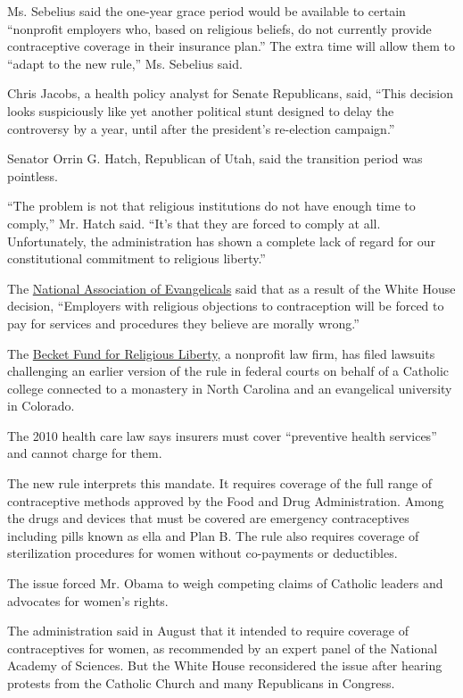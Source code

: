 Ms. Sebelius said the one-year grace period would be available to
certain ``nonprofit employers who, based on religious beliefs, do not
currently provide contraceptive coverage in their insurance plan.'' The
extra time will allow them to ``adapt to the new rule,'' Ms. Sebelius
said.

Chris Jacobs, a health policy analyst for Senate Republicans, said,
``This decision looks suspiciously like yet another political stunt
designed to delay the controversy by a year, until after the president's
re-election campaign.''

Senator Orrin G. Hatch, Republican of Utah, said the transition period
was pointless.

``The problem is not that religious institutions do not have enough time
to comply,'' Mr. Hatch said. ``It's that they are forced to comply at
all. Unfortunately, the administration has shown a complete lack of
regard for our constitutional commitment to religious liberty.''

The
\href{http://www.nae.net/news/715-press-release-evangelicals-disappointed-with-white-house-decision-on-conscience-protection}{National
Association of Evangelicals} said that as a result of the White House
decision, ``Employers with religious objections to contraception will be
forced to pay for services and procedures they believe are morally
wrong.''

The
\href{http://www.becketfund.org/obama-administration-refuses-to-change-abortion-drug-mandate/}{Becket
Fund for Religious Liberty}, a nonprofit law firm, has filed lawsuits
challenging an earlier version of the rule in federal courts on behalf
of a Catholic college connected to a monastery in North Carolina and an
evangelical university in Colorado.

The 2010 health care law says insurers must cover ``preventive health
services'' and cannot charge for them.

The new rule interprets this mandate. It requires coverage of the full
range of contraceptive methods approved by the Food and Drug
Administration. Among the drugs and devices that must be covered are
emergency contraceptives including pills known as ella and Plan B. The
rule also requires coverage of sterilization procedures for women
without co-payments or deductibles.

The issue forced Mr. Obama to weigh competing claims of Catholic leaders
and advocates for women's rights.

The administration said in August that it intended to require coverage
of contraceptives for women, as recommended by an expert panel of the
National Academy of Sciences. But the White House reconsidered the issue
after hearing protests from the Catholic Church and many Republicans in
Congress.

